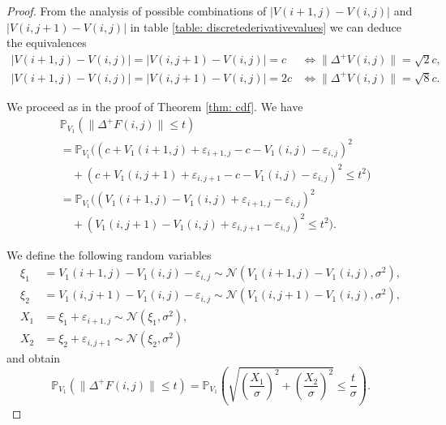 \documentclass[a4paper,12pt]{article}
\newcommand{\abs}[1]{\lvert#1\rvert}
\newcommand{\norm}[1]{\lVert#1\rVert}
\theoremstyle{plain}
\theoremstyle{definition}
\begin{document}
\begin{proof}
	From the analysis of possible combinations of $\abs{V(i + 1, j) - V(i, j)}$ and $\abs{V(i, j + 1) - V(i, j)}$ in table \ref{table: discretederivativevalues} we can deduce the equivalences
	\begin{align*}
		\abs{V(i + 1, j) - V(i, j)} = \abs{V(i, j + 1) - V(i, j)} = c &\Leftrightarrow \norm{\Delta^+ V(i, j)} = \sqrt{2} c, \\
		\abs{V(i + 1, j) - V(i, j)} = \abs{V(i, j + 1) - V(i, j)} = 2 c &\Leftrightarrow \norm{\Delta^+ V(i, j)} = \sqrt{8} c.
	\end{align*}
	
	We proceed as in the proof of Theorem \ref{thm: cdf}. We have
	\begin{align*}
		&\mathbb{P}_{V_1}\left( \norm{\Delta^+ F(i, j)} \leq t \right) \\
		&= \mathbb{P}_{V_1}\big( (c + V_1(i + 1, j) + \varepsilon_{i + 1, j} - c - V_1(i, j) - \varepsilon_{i, j})^2 \\
		&\quad + (c + V_1(i, j + 1) + \varepsilon_{i, j + 1} - c - V_1(i, j) - \varepsilon_{i, j})^2 \leq t^2 \big) \\
		&= \mathbb{P}_{V_1}\big( (V_1(i + 1, j) - V_1(i, j) + \varepsilon_{i + 1, j} - \varepsilon_{i, j})^2 \\
		&\quad + (V_1(i, j + 1) - V_1(i, j) + \varepsilon_{i, j + 1} - \varepsilon_{i, j})^2 \leq t^2 \big).
	\end{align*}
	
	We define the following random variables
	\begin{align*}
		\xi_1 &= V_1(i + 1, j) - V_1(i, j) - \varepsilon_{i, j} \sim \mathcal{N}\left( V_1(i + 1, j) - V_1(i, j), \sigma^2 \right), \\
		\xi_2 &= V_1(i, j + 1) - V_1(i, j) - \varepsilon_{i, j} \sim \mathcal{N}\left( V_1(i, j + 1) - V_1(i, j), \sigma^2 \right), \\
		X_1 &= \xi_1 + \varepsilon_{i + 1, j} \sim \mathcal{N}\left( \xi_1, \sigma^2 \right), \\
		X_2 &= \xi_2 + \varepsilon_{i, j + 1} \sim \mathcal{N}\left( \xi_2, \sigma^2 \right)
	\end{align*}
	and obtain
	\begin{equation*}
		\mathbb{P}_{V_1}\left( \norm{\Delta^+ F(i, j)} \leq t \right) = \mathbb{P}_{V_1}\left( \sqrt{\left( \frac{X_1}{\sigma} \right)^2 + \left( \frac{X_2}{\sigma} \right)^2} \leq \frac{t}{\sigma} \right).
	\end{equation*}
	

\end{proof}
\end{document}
